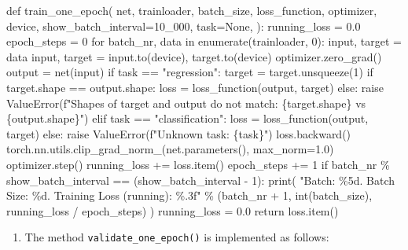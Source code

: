 \documentclass[
  letterpaper,
  DIV=11,
  numbers=noendperiod]{scrreprt}
\newenvironment{Shaded}{\begin{snugshade}}{\end{snugshade}}
\newcommand{\NormalTok}[1]{\textcolor[rgb]{0.00,0.23,0.31}{#1}}
\providecommand{\tightlist}{%
  \setlength{\itemsep}{0pt}\setlength{\parskip}{0pt}}\usepackage{longtable,booktabs,array}
\begin{document}
\begin{Shaded}
\begin{Highlighting}[]
\NormalTok{def train\_one\_epoch(}
\NormalTok{    net,}
\NormalTok{    trainloader,}
\NormalTok{    batch\_size,}
\NormalTok{    loss\_function,}
\NormalTok{    optimizer,}
\NormalTok{    device,}
\NormalTok{    show\_batch\_interval=10\_000,}
\NormalTok{    task=None,}
\NormalTok{):}
\NormalTok{    running\_loss = 0.0}
\NormalTok{    epoch\_steps = 0}
\NormalTok{    for batch\_nr, data in enumerate(trainloader, 0):}
\NormalTok{        input, target = data}
\NormalTok{        input, target = input.to(device), target.to(device)}
\NormalTok{        optimizer.zero\_grad()}
\NormalTok{        output = net(input)}
\NormalTok{        if task == "regression":}
\NormalTok{            target = target.unsqueeze(1)}
\NormalTok{            if target.shape == output.shape:}
\NormalTok{                loss = loss\_function(output, target)}
\NormalTok{            else:}
\NormalTok{                raise ValueError(f"Shapes of target and output do not match:}
\NormalTok{                 \{target.shape\} vs \{output.shape\}")}
\NormalTok{        elif task == "classification":}
\NormalTok{            loss = loss\_function(output, target)}
\NormalTok{        else:}
\NormalTok{            raise ValueError(f"Unknown task: \{task\}")}
\NormalTok{        loss.backward()}
\NormalTok{        torch.nn.utils.clip\_grad\_norm\_(net.parameters(), max\_norm=1.0)}
\NormalTok{        optimizer.step()}
\NormalTok{        running\_loss += loss.item()}
\NormalTok{        epoch\_steps += 1}
\NormalTok{        if batch\_nr \% show\_batch\_interval == (show\_batch\_interval {-} 1):  }
\NormalTok{            print(}
\NormalTok{                "Batch: \%5d. Batch Size: \%d. Training Loss (running): \%.3f"}
\NormalTok{                \% (batch\_nr + 1, int(batch\_size), running\_loss / epoch\_steps)}
\NormalTok{            )}
\NormalTok{            running\_loss = 0.0}
\NormalTok{    return loss.item()}
\end{Highlighting}
\end{Shaded}

\begin{enumerate}
\def\labelenumi{\arabic{enumi}.}
\setcounter{enumi}{4}
\tightlist
\item
  The method \texttt{validate\_one\_epoch()} is implemented as follows:
\end{enumerate}
\end{document}
